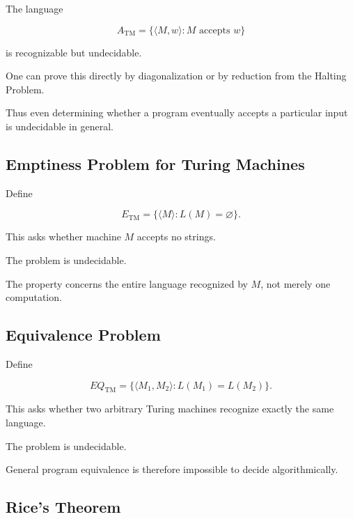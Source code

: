 The language

\[
A_{\mathrm{TM}}
=
\{
\langle M,w\rangle:
M
\text{ accepts }w
\}
\]

is recognizable but undecidable.

One can prove this directly by diagonalization or by reduction from the
Halting Problem.

Thus even determining whether a program eventually accepts a particular
input is undecidable in general.

\subsection{Emptiness Problem for Turing Machines}
\label{subsec:turing-emptiness}

Define

\[
\boxed{
E_{\mathrm{TM}}
=
\{
\langle M\rangle:
L(M)=\varnothing
\}.
}
\]

This asks whether machine \(M\) accepts no strings.

The problem is undecidable.

The property concerns the entire language recognized by \(M\), not merely
one computation.

\subsection{Equivalence Problem}
\label{subsec:turing-equivalence-problem}

Define

\[
\boxed{
EQ_{\mathrm{TM}}
=
\{
\langle M_1,M_2\rangle:
L(M_1)=L(M_2)
\}.
}
\]

This asks whether two arbitrary Turing machines recognize exactly the same
language.

The problem is undecidable.

General program equivalence is therefore impossible to decide
algorithmically.

\subsection{Rice's Theorem}
\label{subsec:rices-theorem}

